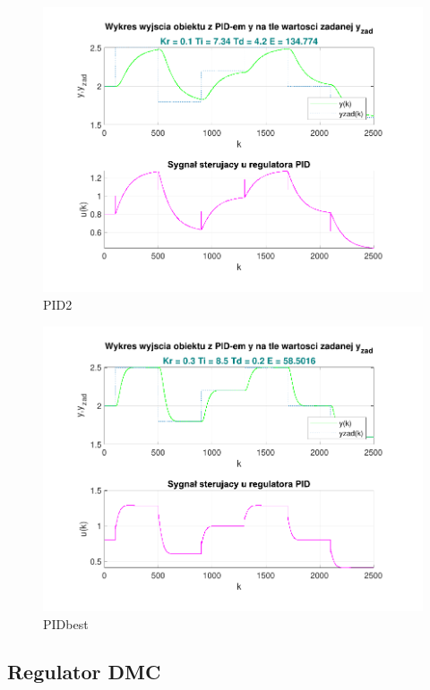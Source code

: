 \begin{figure}[H]
    \centering
    \includegraphics[scale=0.90]{../projekt/zad4_5/PID_pdf/PID_2.pdf}
    \caption{PID2}
\end{figure}

\begin{figure}[H]
    \centering
    \includegraphics[scale=0.90]{../projekt/zad4_5/PID_pdf/PID_best.pdf}
    \caption{PIDbest}
\end{figure}

\subsection{Regulator DMC}

